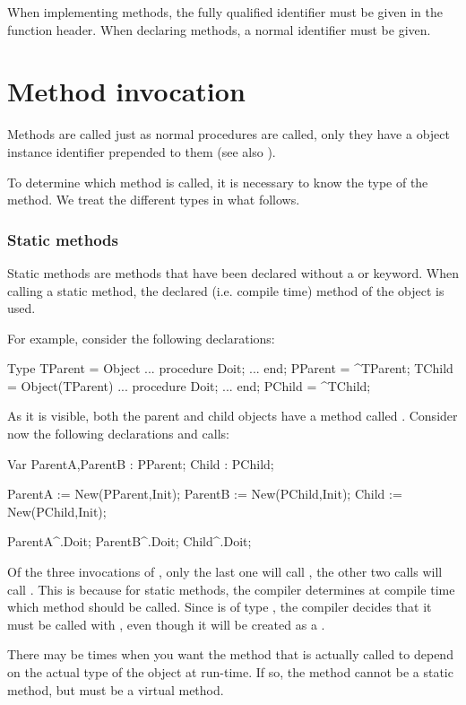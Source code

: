 \documentclass{report}
\begin{document}
When implementing methods, the fully qualified identifier must be given
in the function header. When declaring methods, a normal identifier must be
given. 

\section{Method invocation}
Methods are called just as normal procedures are called, only they have a 
object instance identifier prepended to them (see also ).

To determine which method is called, it is necessary to know the type of
the method. We treat the different types in what follows.

\subsubsection{Static methods}
Static methods are methods that have been declared without a 
or  keyword. When calling a static method, the declared (i.e.
compile time) method of the object is used.

For example, consider the following declarations:
\begin{listing}
Type
  TParent = Object 
    ...
    procedure Doit;
    ...
    end;
  PParent = ^TParent;
  TChild = Object(TParent) 
    ...
    procedure Doit;
    ...
    end;
  PChild = ^TChild;  
\end{listing}
As it is visible, both the parent and child objects have a method called
. Consider now the following declarations and calls:
\begin{listing}
Var ParentA,ParentB : PParent;
    Child           : PChild;

   ParentA := New(PParent,Init);
   ParentB := New(PChild,Init);
   Child := New(PChild,Init);

   ParentA^.Doit;
   ParentB^.Doit;
   Child^.Doit;
\end{listing}
Of the three invocations of , only the last one will call
, the other two calls will call .
This is because for static methods, the compiler determines at compile 
time which method should be called. Since  is of type
, the compiler decides that it must be called with
, even though it will be created as a .

There may be times when you want the method that is actually called to
depend on the actual type of the object at run-time. If so, the method
cannot be a static method, but must be a virtual method.
\end{document}
